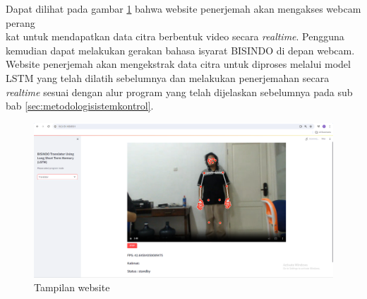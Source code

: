Dapat dilihat pada gambar \ref{fig:tampilanwebsite} bahwa website penerjemah akan mengakses webcam perang\\kat untuk mendapatkan data citra berbentuk video secara \emph{realtime}. Pengguna kemudian dapat melakukan gerakan bahasa isyarat BISINDO di depan webcam. Website penerjemah akan mengekstrak data citra untuk diproses melalui model LSTM yang telah dilatih sebelumnya dan melakukan penerjemahan secara \emph{realtime} sesuai dengan alur program yang telah dijelaskan sebelumnya pada sub bab \ref{sec:metodologisistemkontrol}. 

\begin{figure}[H]
  \centering

  \includegraphics[scale=0.2]{gambar/bab3-layoutweb.png}

  \caption{Tampilan website}
  \label{fig:tampilanwebsite}
\end{figure}




